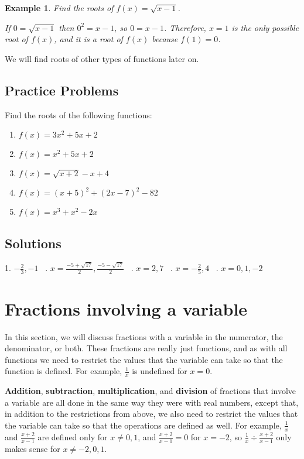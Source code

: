 \documentclass[11pt]{book}               %
\newtheorem{example}{Example}
\begin{document}
\begin{example} Find the roots of $ f(x) = \sqrt{x-1} $.

\normalfont

If $0=\sqrt{x-1}$ then $0^2=x-1$, so $0=x-1$. Therefore, $x=1$ is the only possible root of $f(x)$, and it is a root of $f(x)$ because $f(1) = 0$. 

\end{example}

We will find roots of other types of functions later on. 

\subsection{Practice Problems}

Find the roots of the following functions:
\begin{enumerate}
\item $ f(x)=3x^2+5x+2 $ 
\item $f(x)= x^2+5x+2 $ 
\item $f(x)= \sqrt{x+2} -x +4 $ 
\item $f(x)=(x+5)^2 +(2x-7)^2-82 $ 
\item $f(x)= x^3 + x^2 - 2x$
\end{enumerate}

\subsection{Solutions} 
1.  $-\frac{2}{3}, -1 $ \  .  $ x=\frac{-5 + \sqrt{17}}{2}, \frac{-5 - \sqrt{17}}{2}$ \ .  $x=2,7 $ \  .  $ x=-\frac{2}{5},4 $ \ . $x=0,1,-2 $ \ \quad

\newpage
\section{Fractions involving a variable}
In this section, we will discuss fractions with a variable in the numerator, the denominator, or both. 
These fractions are really just functions, and as with all functions we need to restrict the values that the variable can take so that the function is defined.
For example, $\frac{1}{x}$ is undefined for $x=0$. 

\textbf{Addition}, \textbf{subtraction}, \textbf{multiplication}, and \textbf{division} of fractions that involve a variable are all done in the same way they were with real numbers, except that, in addition to the restrictions from above, we also need to restrict the values that the variable can take so that the operations are defined as well.
For example, $\frac{1}{x}$ and  $\frac{x+2}{x-1}$ are defined only for $x\neq0,1$, and $\frac{x+2}{x-1}=0$ for $x=-2$, so $\frac{1}{x}\div\frac{x+2}{x-1}$ only makes sense for $x\neq-2,0,1$.
\end{document}
